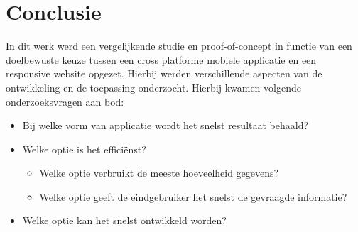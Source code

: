 
\chapter{Conclusie}
\label{ch:conclusie}








In dit werk werd een vergelijkende studie en proof-of-concept in functie van een doelbewuste keuze tussen een
cross platforme mobiele applicatie en een responsive website opgezet. Hierbij werden verschillende aspecten van de ontwikkeling
en de toepassing onderzocht. Hierbij kwamen volgende onderzoeksvragen aan bod:

\begin{itemize}
  \item{Bij welke vorm van applicatie wordt het snelst resultaat behaald?}
  \item{Welke optie is het efficiënst?}
  \begin{itemize}
    \item{Welke optie verbruikt de meeste hoeveelheid gegevens?}
    \item{Welke optie geeft de eindgebruiker het snelst de gevraagde informatie?}
  \end{itemize}
  \item{Welke optie kan het snelst ontwikkeld worden?}
\end{itemize}

